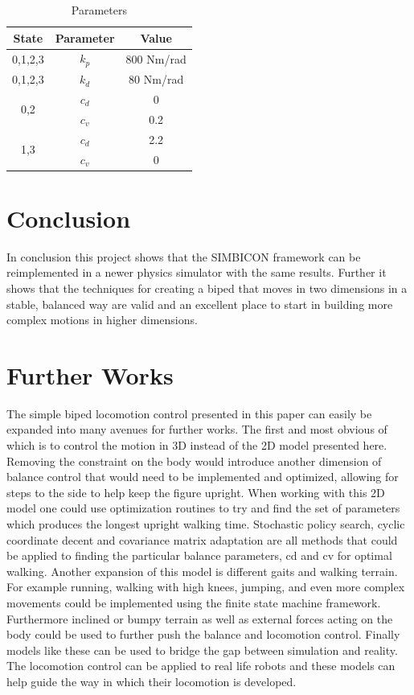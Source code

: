 \documentclass[12pt, a4paper]{article}
\begin{document}
\begin{table}[ht]
\caption{Parameters}
\begin{center}
\begin{tabular}{|c|c|c|}
\hline
State & Parameter & Value \\
\hline
0,1,2,3 & $k_p$ & 800 Nm/rad\\
\hline
0,1,2,3 & $k_d$ & 80 Nm/rad\\
\hline
\multirow{2}{*}{0,2}& $c_d$ & 0\\\cline{2-3}
& $c_v$ & 0.2\\ \cline{2-3}
\hline
\multirow{2}{*}{1,3}& $c_d$ & 2.2\\\cline{2-3}
& $c_v$ & 0\\ \cline{2-3}
\hline
\end{tabular}
\end{center}
\label{tbl:parameters}
\end{table}

\section{Conclusion}

In conclusion this project shows that the SIMBICON framework can be reimplemented in a newer physics simulator with the same results. Further it shows that the techniques for creating a biped that moves in two dimensions in a stable, balanced way are valid and an excellent place to start in building more complex motions in higher dimensions. 
 
\section{Further Works}
The simple biped locomotion control presented in this paper can easily be expanded into many avenues for further works. The first and most obvious of which is to control the motion in 3D instead of the 2D model presented here. Removing the constraint on the body would introduce another dimension of balance control that would need to be implemented and optimized, allowing for steps to the side to help keep the figure upright. When working with this 2D model one could use optimization routines to try and find the set of parameters which produces the longest upright walking time. Stochastic policy search, cyclic coordinate decent and covariance matrix adaptation are all methods that could be applied to finding the particular balance parameters, cd and cv for optimal walking. Another expansion of this model is different gaits and walking terrain. For example running, walking with high knees, jumping, and even more complex movements could be implemented using the finite state machine framework. Furthermore inclined or bumpy terrain as well as external forces acting on the body could be used to further push the balance and locomotion control. Finally models like these can be used to bridge the gap between simulation and reality. The locomotion control can be applied to real life robots and these models can help guide the way in which their locomotion is developed. 
\end{document}

